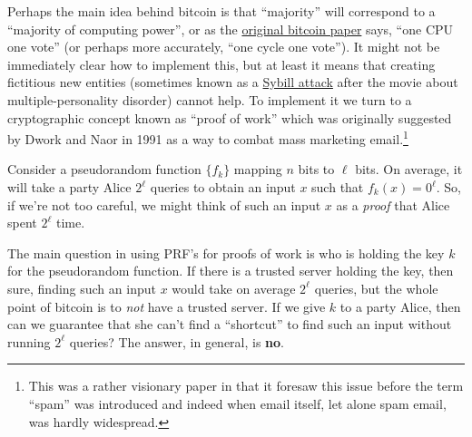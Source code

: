 Perhaps the main idea behind bitcoin is that ``majority'' will
correspond to a ``majority of computing power'', or as the
\href{https://bitcoin.org/bitcoin.pdf}{original bitcoin paper} says,
``one CPU one vote'' (or perhaps more accurately, ``one cycle one
vote''). It might not be immediately clear how to implement this, but at
least it means that creating fictitious new entities (sometimes known as
a \href{https://goo.gl/jMZ7Qg}{Sybill attack} after the movie about
multiple-personality disorder) cannot help. To implement it we turn to a
cryptographic concept known as ``proof of work'' which was originally
suggested by Dwork and Naor in 1991 as a way to combat mass marketing
email.\footnote{This was a rather visionary paper in that it foresaw
  this issue before the term ``spam'' was introduced and indeed when
  email itself, let alone spam email, was hardly widespread.}

Consider a pseudorandom function \(\{ f_k \}\) mapping \(n\) bits to
\(\ell\) bits. On average, it will take a party Alice \(2^\ell\) queries
to obtain an input \(x\) such that \(f_k(x)=0^\ell\). So, if we're not
too careful, we might think of such an input \(x\) as a \emph{proof}
that Alice spent \(2^\ell\) time.


The main question in using PRF's for proofs of work is who is holding
the key \(k\) for the pseudorandom function. If there is a trusted
server holding the key, then sure, finding such an input \(x\) would
take on average \(2^\ell\) queries, but the whole point of bitcoin is to
\emph{not} have a trusted server. If we give \(k\) to a party Alice,
then can we guarantee that she can't find a ``shortcut'' to find such an
input without running \(2^\ell\) queries? The answer, in general, is
\textbf{no}.


